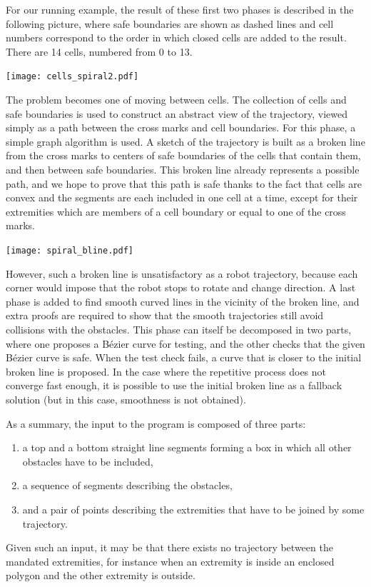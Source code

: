 \documentclass{easychair}
\begin{document}
For our running example, the result of these first two phases is
described in the following picture, where safe boundaries are shown as
dashed lines and cell numbers correspond to the order in which closed
cells are added to the result.  There are 14 cells, numbered from 0 to 13.
\begin{center}
\texttt{[image: cells\_spiral2.pdf]}
\end{center}
The problem becomes one of moving between cells. The collection of cells and
safe boundaries is used to
construct an abstract view of the trajectory, viewed simply as a path
between the cross marks and cell boundaries.  For this phase, a simple
graph algorithm is
used.  A sketch of the trajectory is built as a broken line from the
cross marks to centers of safe boundaries of the cells that contain
them, and then
between safe boundaries.  This broken line already represents a possible
path, and we hope to prove that this path is safe thanks to the fact
that cells are convex and the segments are each included in one
cell at a time, except for their extremities which are members of a cell
boundary or equal to one of the cross marks.
\begin{center}
\texttt{[image: spiral\_bline.pdf]}
\end{center}
However, such a broken line is unsatisfactory
as a robot trajectory, because each corner would impose that the robot
stops to rotate and change direction.  A last phase is added to find
smooth curved lines in the vicinity of the broken line, and extra proofs are
required to show that the smooth trajectories still avoid collisions with
the obstacles.  This phase can itself be decomposed in two parts, where one
proposes a Bézier curve for testing, and the other checks that the given
Bézier curve is safe.  When the test check fails, a curve that is closer
to the initial broken line is proposed.  In the case where the
repetitive process does not converge fast enough, it is possible to
use the initial broken line as
a fallback solution (but in this case, smoothness is not obtained).

As a summary, the input to the program is composed of three parts:
\begin{enumerate}
\item a top and a bottom straight line segments forming a box in
which all other obstacles have to be included,
\item a sequence of segments describing the obstacles,
\item and a pair of points describing the extremities that have to be
joined by some trajectory.
\end{enumerate}
Given such an input, it may be that there exists no trajectory between
the mandated extremities, for instance when an extremity is inside
an enclosed polygon and the other extremity is outside.
\end{document}
